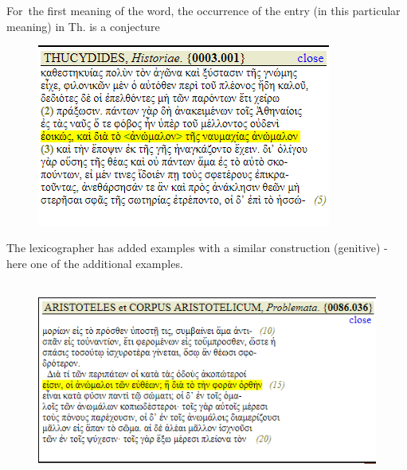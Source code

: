 \documentclass[10pt]{article}
\begin{document}

\par

 For\ the first meaning of the word, the occurrence of the entry (in this particular meaning)  in Th. is a conjecture\par




\begin{figure}[H]
	\begin{Center}
		\includegraphics[width=3.8in,height=2.36in]{./image16.png}
	\end{Center}
\end{figure}



\par

 The lexicographer has added examples with a similar construction (genitive) - here one of the additional examples.\par




\begin{figure}[H]
	\begin{Center}
		\includegraphics[width=5.2in,height=2.56in]{./image11.png}
	\end{Center}
\end{figure}
\end{document}
